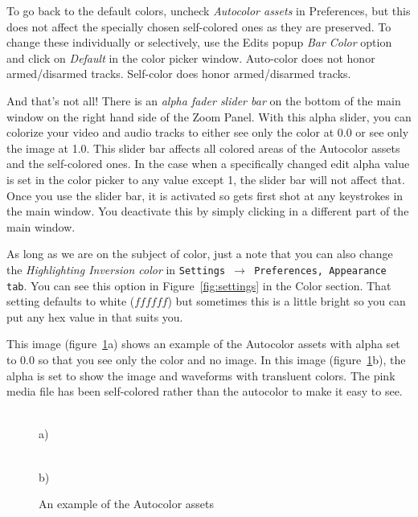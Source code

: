 To go back to the default colors, uncheck \textit{Autocolor assets} in Preferences, but this does not affect the specially chosen self-colored ones as they are preserved.  
To change these individually or  selectively, use the Edits popup \emph{Bar Color} option and click on \textit{Default} in the color picker window.  Auto-color does not honor armed/disarmed tracks.  
Self-color does honor armed/disarmed tracks.

And that’s not all!  
There is an \emph{alpha fader slider bar} on the bottom of the main window on the right hand side of the Zoom Panel.  
With this alpha slider, you can colorize your video and audio tracks to either see only the color at 0.0 or see only the image at 1.0.  
This slider bar affects all colored areas of the Autocolor assets and the self-colored ones.  
In the case when a specifically changed edit alpha value is set in the color picker
to any value except 1, the slider bar will not affect that.  
Once you use the slider bar, it is activated so gets first shot at any keystrokes in the main window.  
You deactivate this by simply clicking in a different part of the main window.  

As long as we are on the subject of color, just a note that you can also change the \textit{Highlighting Inversion color} in \texttt{Settings $\rightarrow$ Preferences, Appearance tab}.  You can see this option in Figure~\ref{fig:settings} in the Color section.  
That setting defaults to white ($ffffff$) but sometimes this is a little bright so you can put any hex value in that suits you.

This image (figure~\ref{fig:autocolor_assets_alpha}a) shows an example of the Autocolor assets with alpha set to 0.0 so that you see only the color and no image.
In this image (figure~\ref{fig:autocolor_assets_alpha}b), the alpha is set to show the image
and waveforms with transluent colors.  The pink media file has been self-colored rather than the autocolor to make it easy to see.

\begin{figure}[htpb]
    \centering
    \begin{minipage}[h]{0.55\linewidth}
         \\ a)
    \end{minipage}
    \begin{minipage}[h]{0.4\linewidth}
         \\ b)
    \end{minipage}
    \caption{An example of the Autocolor assets}
    \label{fig:autocolor_assets_alpha}
\end{figure}


